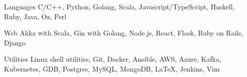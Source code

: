 

\begin{cvskills}


  \cvskill
  {Languages}
  {C/C++, Python, Golang, Scala, Javascript/TypeScript, Haskell, Ruby, Java, Oz, Perl}


  \cvskill
  {Web}
  {Akka with Scala, Gin with Golang, Node.js, React, Flask, Ruby on Rails, Django}


  \cvskill
  {Utilities}
  {Linux shell utilities, Git, Docker, Ansible, AWS, Azure, Kafka, Kubernetes, GDB, Postgres, MySQL, MongoDB, \LaTeX, Jenkins, Vim}




\end{cvskills}
